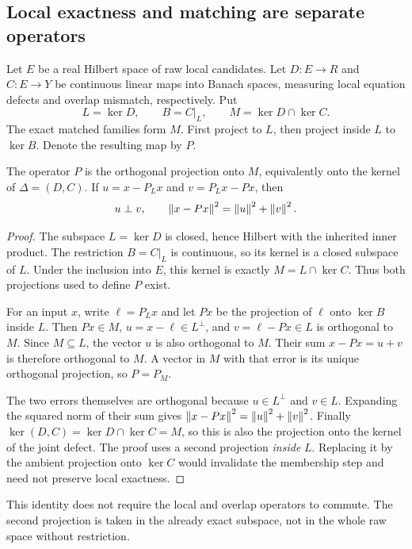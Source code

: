 \subsection{Local exactness and matching are separate operators}
Let \(E\) be a real Hilbert space of raw local candidates. Let \(D:E\to R\) and \(C:E\to Y\) be continuous linear maps into Banach spaces, measuring local equation defects and overlap mismatch, respectively. Put
\[
 L=\ker D,\qquad B=C|_L,
 \qquad M=\ker D\cap\ker C.
\]
The exact matched families form \(M\). First project to \(L\), then project inside \(L\) to \(\ker B\). Denote the resulting map by \(P\).

\begin{theorem}\label{KS46}
The operator \(P\) is the orthogonal projection onto \(M\), equivalently onto the kernel of \(\Delta=(D,C)\). If \(u=x-P_Lx\) and \(v=P_Lx-Px\), then
\[
 u\perp v,\qquad\left\lVert x-Px\right\rVert^2=\left\lVert u\right\rVert^2+\left\lVert v\right\rVert^2.
\]
\end{theorem}
\begin{proof}
The subspace \(L=\ker D\) is closed, hence Hilbert with the inherited inner product. The restriction \(B=C|_L\) is continuous, so its kernel is a closed subspace of \(L\). Under the inclusion into \(E\), this kernel is exactly \(M=L\cap\ker C\). Thus both projections used to define \(P\) exist.

For an input \(x\), write \(\ell=P_Lx\) and let \(Px\) be the projection of \(\ell\) onto \(\ker B\) inside \(L\). Then \(Px\in M\), \(u=x-\ell\in L^\perp\), and \(v=\ell-Px\in L\) is orthogonal to \(M\). Since \(M\subseteq L\), the vector \(u\) is also orthogonal to \(M\). Their sum \(x-Px=u+v\) is therefore orthogonal to \(M\). A vector in \(M\) with that error is its unique orthogonal projection, so \(P=P_M\).

The two errors themselves are orthogonal because \(u\in L^\perp\) and \(v\in L\). Expanding the squared norm of their sum gives \(\left\lVert x-Px\right\rVert^2=\left\lVert u\right\rVert^2+\left\lVert v\right\rVert^2\). Finally \(\ker(D,C)=\ker D\cap\ker C=M\), so this is also the projection onto the kernel of the joint defect. The proof uses a second projection \emph{inside} \(L\). Replacing it by the ambient projection onto \(\ker C\) would invalidate the membership step and need not preserve local exactness.
\end{proof}
This identity does not require the local and overlap operators to commute. The second projection is taken in the already exact subspace, not in the whole raw space without restriction.

